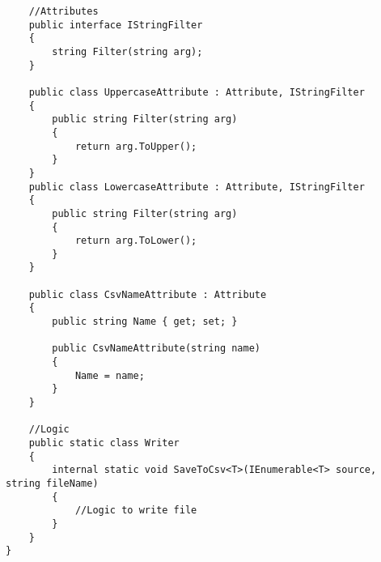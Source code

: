 \begin{multicols*}{2}
\begin{lstlisting}
    //Attributes
    public interface IStringFilter
    {
        string Filter(string arg);
    }

    public class UppercaseAttribute : Attribute, IStringFilter
    {
        public string Filter(string arg)
        {
            return arg.ToUpper();
        }
    }
    public class LowercaseAttribute : Attribute, IStringFilter
    {
        public string Filter(string arg)
        {
            return arg.ToLower();
        }
    }

    public class CsvNameAttribute : Attribute
    {
        public string Name { get; set; }

        public CsvNameAttribute(string name)
        {
            Name = name;
        }
    }

    //Logic
    public static class Writer
    {
        internal static void SaveToCsv<T>(IEnumerable<T> source, string fileName)
        {
            //Logic to write file
        }
    }
}
\end{lstlisting}
\end{multicols*}